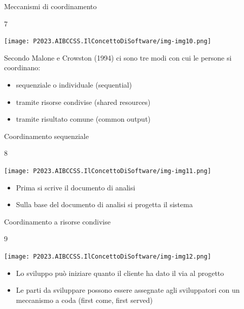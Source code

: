 \documentclass{beamer}
\begin{document}
\begin{frame}{\centerline{Meccanismi di coordinamento}}
7
\begin{center}
\texttt{[image: P2023.AIBCCSS.IlConcettoDiSoftware/img-img10.png]}
\end{center}

Secondo Malone e Crowston (1994) ci sono tre modi con cui le persone si coordinano:
\begin{itemize}
\item  sequenziale o individuale (sequential)
\item  tramite risorse condivise (shared resources)
\item  tramite risultato comune (common output)
\end{itemize}

\end{frame}

\begin{frame}{\centerline{Coordinamento sequenziale}}
8

\begin{center}
\texttt{[image: P2023.AIBCCSS.IlConcettoDiSoftware/img-img11.png]}
\end{center}

\begin{itemize}
\item  Prima si scrive il documento di analisi


\item  Sulla base del documento di analisi si progetta il sistema


 
\end{itemize}

\end{frame}

\begin{frame}{\centerline{Coordinamento a risorse condivise}}
9
\begin{center}
\texttt{[image: P2023.AIBCCSS.IlConcettoDiSoftware/img-img12.png]}
\end{center}

\begin{itemize}
\item  Lo sviluppo pu\`{o} iniziare quanto il cliente ha dato il via al progetto

\item Le parti da sviluppare possono essere assegnate agli sviluppatori con un meccanismo a coda (first come, first served)


\end{itemize}


\end{frame}
\end{document}
